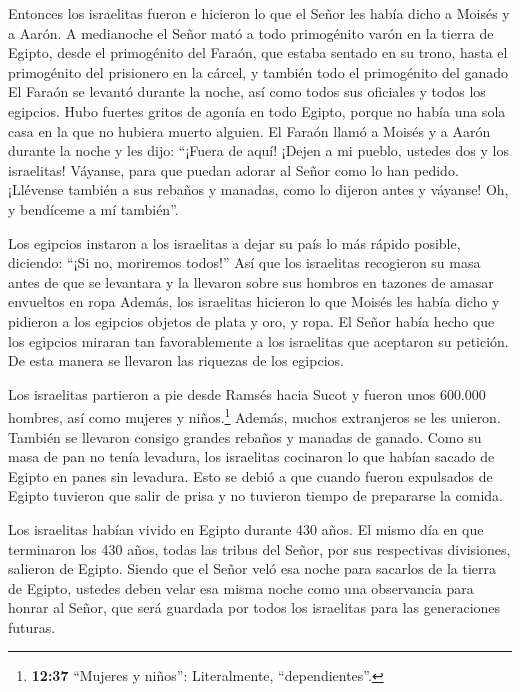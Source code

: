  Entonces los israelitas fueron e hicieron lo que el Señor
les había dicho a Moisés y a Aarón.  A medianoche el Señor
mató a todo primogénito varón en la tierra de Egipto, desde el
primogénito del Faraón, que estaba sentado en su trono, hasta el
primogénito del prisionero en la cárcel, y también todo el primogénito
del ganado  El Faraón se levantó durante la noche, así como
todos sus oficiales y todos los egipcios. Hubo fuertes gritos de agonía
en todo Egipto, porque no había una sola casa en la que no hubiera
muerto alguien.  El Faraón llamó a Moisés y a Aarón durante
la noche y les dijo: ``¡Fuera de aquí! ¡Dejen a mi pueblo, ustedes dos y
los israelitas! Váyanse, para que puedan adorar al Señor como lo han
pedido.  ¡Llévense también a sus rebaños y manadas, como lo
dijeron antes y váyanse! Oh, y bendíceme a mí también''.

 Los egipcios instaron a los israelitas a dejar su país lo
más rápido posible, diciendo: ``¡Si no, moriremos todos!'' 
Así que los israelitas recogieron su masa antes de que se levantara y la
llevaron sobre sus hombros en tazones de amasar envueltos en ropa
 Además, los israelitas hicieron lo que Moisés les había
dicho y pidieron a los egipcios objetos de plata y oro, y ropa.
 El Señor había hecho que los egipcios miraran tan
favorablemente a los israelitas que aceptaron su petición. De esta
manera se llevaron las riquezas de los egipcios.

 Los israelitas partieron a pie desde Ramsés hacia Sucot y
fueron unos 600.000 hombres, así como mujeres y niños.\footnote{\textbf{12:37}
  ``Mujeres y niños'': Literalmente, ``dependientes''.} 
Además, muchos extranjeros se les unieron. También se llevaron consigo
grandes rebaños y manadas de ganado.  Como su masa de pan
no tenía levadura, los israelitas cocinaron lo que habían sacado de
Egipto en panes sin levadura. Esto se debió a que cuando fueron
expulsados de Egipto tuvieron que salir de prisa y no tuvieron tiempo de
prepararse la comida.

 Los israelitas habían vivido en Egipto durante 430 años.
 El mismo día en que terminaron los 430 años, todas las
tribus del Señor, por sus respectivas divisiones, salieron de Egipto.
 Siendo que el Señor veló esa noche para sacarlos de la
tierra de Egipto, ustedes deben velar esa misma noche como una
observancia para honrar al Señor, que será guardada por todos los
israelitas para las generaciones futuras.

